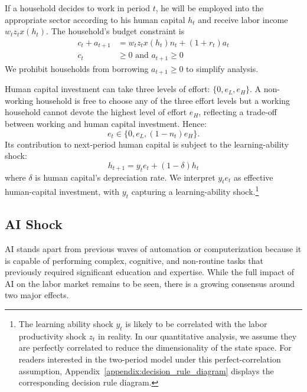 \documentclass[12pt,english]{article}
\numberwithin{equation}{section}
\begin{document}
If a household decides to work in period $t$, he will be employed into the appropriate sector according to his human capital $h_t$ and receive labor income $w_tz_tx(h_t)$. The household's budget constraint is
\begin{align}
    c_t+a_{t+1}&=w_tz_tx(h_t)n_t+(1+r_t)a_t \\
    c_t& \geq 0 \text{ and } a_{t+1} \geq 0
\end{align}
We prohibit households from borrowing $a_{t+1} \geq 0$ to simplify analysis.

Human capital investment can take three levels of effort: $\{0,e_L,e_H\}$. A non-working household is free to choose any of the three effort levels but a working household cannot devote the highest level of effort $e_H$, reflecting a trade-off between working and human capital investment. Hence:
\begin{equation}
e_t \in \{0, e_L, (1-n_t)e_H\}.
\end{equation}
Its contribution to next-period human capital is subject to the learning-ability shock:
\begin{equation}
h_{t+1}=y_te_t + (1-\delta)h_t
\end{equation}
where $\delta$ is human capital's depreciation rate. We interpret $y_t e_t$ as effective human-capital investment, with $y_t$ capturing a learning-ability shock.\footnote{The learning ability shock $y_t$ is likely to be correlated with the labor productivity shock $z_t$ in reality. In our quantitative analysis, we assume they are perfectly correlated to reduce the dimensionality of the state space. For readers interested in the two-period model under this perfect-correlation assumption, Appendix~\ref{appendix:decision_rule_diagram} displays the corresponding decision rule diagram.}


\subsection{AI Shock}
AI stands apart from previous waves of automation or computerization because it is capable of performing complex, cognitive, and non-routine tasks that previously required significant education and expertise. While the full impact of AI on the labor market remains to be seen, there is a growing consensus around two major effects.
\end{document}
